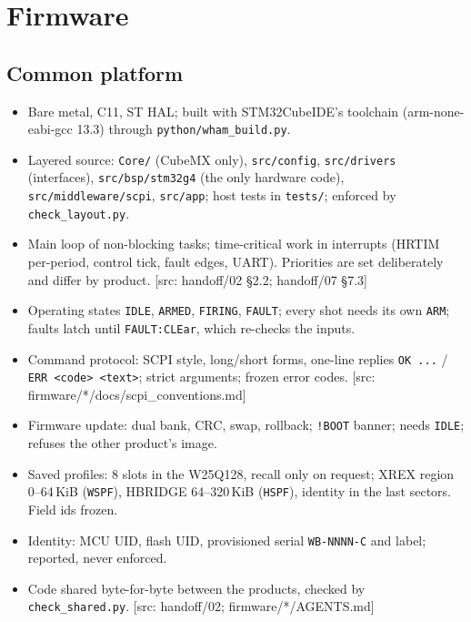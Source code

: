 \documentclass[11pt]{article}
\newcommand{\code}[1]{\texttt{#1}}
\newcommand{\file}[1]{\nolinkurl{#1}}
\newcommand{\src}[1]{{\scriptsize\textcolor[gray]{0.45}{[src: #1]}}}
\begin{document}
\section{Firmware}
\label{sec:firmware}

\subsection{Common platform}
\label{sec:platform}
\begin{itemize}
  \item Bare metal, C11, ST HAL; built with STM32CubeIDE's toolchain (arm-none-eabi-gcc 13.3) through \code{python/wham\_build.py}.
  \item Layered source: \file{Core/} (CubeMX only), \file{src/config}, \file{src/drivers} (interfaces), \file{src/bsp/stm32g4}
    (the only hardware code), \file{src/middleware/scpi}, \file{src/app}; host tests in \file{tests/}; enforced by \code{check\_layout.py}.
  \item Main loop of non-blocking tasks; time-critical work in interrupts (HRTIM per-period, control tick, fault edges, UART).
    Priorities are set deliberately and differ by product. \src{handoff/02 \S2.2; handoff/07 \S7.3}
  \item Operating states \code{IDLE}, \code{ARMED}, \code{FIRING}, \code{FAULT}; every shot needs its own \code{ARM}; faults latch
    until \code{FAULT:CLEar}, which re-checks the inputs.
  \item Command protocol: SCPI style, long/short forms, one-line replies \code{OK ...} / \code{ERR <code> <text>}; strict
    arguments; frozen error codes. \src{firmware/*/docs/scpi\_conventions.md}
  \item Firmware update: dual bank, CRC, swap, rollback; \code{!BOOT} banner; needs \code{IDLE}; refuses the other product's image.
  \item Saved profiles: 8 slots in the W25Q128, recall only on request; XREX region 0--64\,KiB (\code{WSPF}), HBRIDGE 64--320\,KiB
    (\code{HSPF}), identity in the last sectors. Field ids frozen.
  \item Identity: MCU UID, flash UID, provisioned serial \code{WB-NNNN-C} and label; reported, never enforced.
  \item Code shared byte-for-byte between the products, checked by \code{check\_shared.py}.
  \src{handoff/02; firmware/*/AGENTS.md}
\end{itemize}
\end{document}
